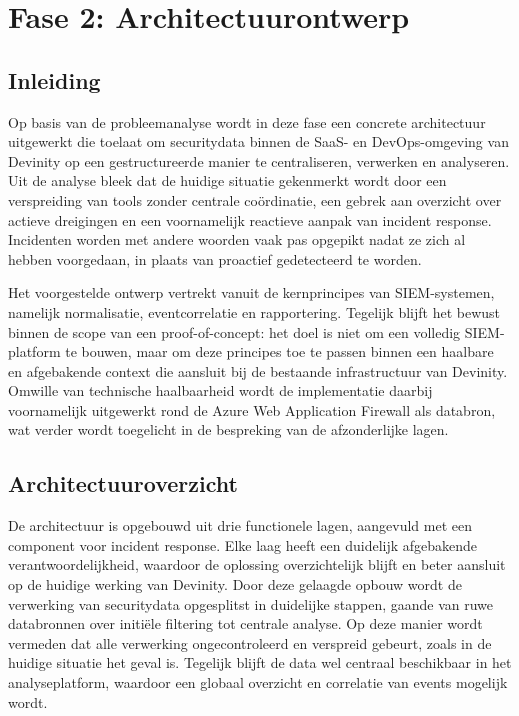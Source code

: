 \chapter{Fase 2: Architectuurontwerp}
\label{ch:architectuurontwerp}

\section{Inleiding}
Op basis van de probleemanalyse wordt in deze fase een concrete architectuur uitgewerkt die toelaat om securitydata binnen de SaaS- en DevOps-omgeving van Devinity op een gestructureerde manier te centraliseren, verwerken en analyseren. Uit de analyse bleek dat de huidige situatie gekenmerkt wordt door een verspreiding van tools zonder centrale coördinatie, een gebrek aan overzicht over actieve dreigingen en een voornamelijk reactieve aanpak van incident response. Incidenten worden met andere woorden vaak pas opgepikt nadat ze zich al hebben voorgedaan, in plaats van proactief gedetecteerd te worden.

Het voorgestelde ontwerp vertrekt vanuit de kernprincipes van SIEM-systemen, namelijk normalisatie, eventcorrelatie en rapportering. Tegelijk blijft het bewust binnen de scope van een proof-of-concept: het doel is niet om een volledig SIEM-platform te bouwen, maar om deze principes toe te passen binnen een haalbare en afgebakende context die aansluit bij de bestaande infrastructuur van Devinity. Omwille van technische haalbaarheid wordt de implementatie daarbij voornamelijk uitgewerkt rond de Azure Web Application Firewall als databron, wat verder wordt toegelicht in de bespreking van de afzonderlijke lagen.

\newpage


\section{Architectuuroverzicht}
De architectuur is opgebouwd uit drie functionele lagen, aangevuld met een component voor incident response. Elke laag heeft een duidelijk afgebakende verantwoordelijkheid, waardoor de oplossing overzichtelijk blijft en beter aansluit op de huidige werking van Devinity. Door deze gelaagde opbouw wordt de verwerking van securitydata opgesplitst in duidelijke stappen, gaande van ruwe databronnen over initiële filtering tot centrale analyse. Op deze manier wordt vermeden dat alle verwerking ongecontroleerd en verspreid gebeurt, zoals in de huidige situatie het geval is. Tegelijk blijft de data wel centraal beschikbaar in het analyseplatform, waardoor een globaal overzicht en correlatie van events mogelijk wordt.

